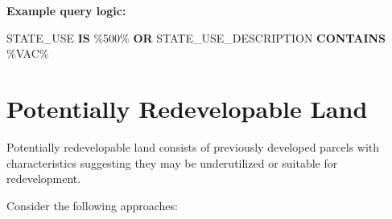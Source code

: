 \documentclass[
  letterpaper,
  DIV=11,
  numbers=noendperiod]{scrreprt}
\newenvironment{Shaded}{\begin{snugshade}}{\end{snugshade}}
\newcommand{\KeywordTok}[1]{\textcolor[rgb]{0.00,0.23,0.31}{\textbf{#1}}}
\newcommand{\NormalTok}[1]{\textcolor[rgb]{0.00,0.23,0.31}{#1}}
\newcommand{\StringTok}[1]{\textcolor[rgb]{0.13,0.47,0.30}{#1}}
\begin{document}
\textbf{Example query logic:}

\begin{Shaded}
\begin{Highlighting}[]
\NormalTok{STATE\_USE }\KeywordTok{IS} \StringTok{\textquotesingle{}\%500\%\textquotesingle{}}  
\KeywordTok{OR}\NormalTok{ STATE\_USE\_DESCRIPTION }\KeywordTok{CONTAINS} \StringTok{\textquotesingle{}\%VAC\%\textquotesingle{}}
\end{Highlighting}
\end{Shaded}

\section{Potentially Redevelopable
Land}\label{potentially-redevelopable-land}

Potentially redevelopable land consists of previously developed parcels
with characteristics suggesting they may be underutilized or suitable
for redevelopment.

Consider the following approaches:
\end{document}
